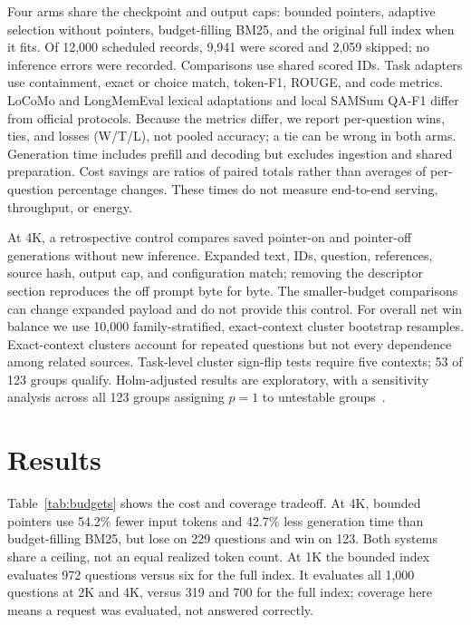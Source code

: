 \documentclass[pdflatex,sn-mathphys-num]{sn-jnl}
\begin{document}
Four arms share the checkpoint and output caps: bounded pointers, adaptive selection without pointers, budget-filling BM25, and the original full index when it fits. Of 12,000 scheduled records, 9,941 were scored and 2,059 skipped; no inference errors were recorded. Comparisons use shared scored IDs. Task adapters use containment, exact or choice match, token-F1, ROUGE, and code metrics. LoCoMo and LongMemEval lexical adaptations and local SAMSum QA-F1 differ from official protocols. Because the metrics differ, we report per-question wins, ties, and losses (W/T/L), not pooled accuracy; a tie can be wrong in both arms. Generation time includes prefill and decoding but excludes ingestion and shared preparation. Cost savings are ratios of paired totals rather than averages of per-question percentage changes. These times do not measure end-to-end serving, throughput, or energy.

At 4K, a retrospective control compares saved pointer-on and pointer-off generations without new inference. Expanded text, IDs, question, references, source hash, output cap, and configuration match; removing the descriptor section reproduces the off prompt byte for byte. The smaller-budget comparisons can change expanded payload and do not provide this control. For overall net win balance we use 10,000 family-stratified, exact-context cluster bootstrap resamples. Exact-context clusters account for repeated questions but not every dependence among related sources. Task-level cluster sign-flip tests require five contexts; 53 of 123 groups qualify. Holm-adjusted results are exploratory, with a sensitivity analysis across all 123 groups assigning $p=1$ to untestable groups~\cite{holm1979}.
\section{Results}
Table~\ref{tab:budgets} shows the cost and coverage tradeoff. At 4K, bounded pointers use 54.2\% fewer input tokens and 42.7\% less generation time than budget-filling BM25, but lose on 229 questions and win on 123. Both systems share a ceiling, not an equal realized token count. At 1K the bounded index evaluates 972 questions versus six for the full index. It evaluates all 1,000 questions at 2K and 4K, versus 319 and 700 for the full index; coverage here means a request was evaluated, not answered correctly.
\end{document}
